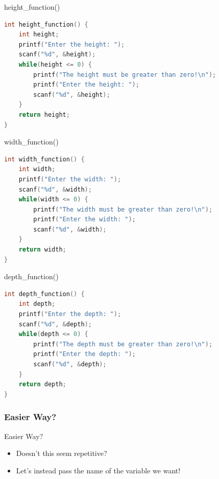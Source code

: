 \documentclass[graphics]{beamer}
\begin{document}
\begin{frame}[fragile]{height\_function()}
    \begin{lstlisting}[language=C,basicstyle=\footnotesize,keywordstyle=\color{blue},commentstyle=\color{green},showstringspaces=false,stringstyle=\color{red}]
int height_function() {
    int height;
    printf("Enter the height: ");
    scanf("%d", &height);
    while(height <= 0) {
        printf("The height must be greater than zero!\n");
        printf("Enter the height: ");
        scanf("%d", &height);
    }
    return height;
}
    \end{lstlisting}
\end{frame}

\begin{frame}[fragile]{width\_function()}
    \begin{lstlisting}[language=C,basicstyle=\footnotesize,keywordstyle=\color{blue},commentstyle=\color{green},showstringspaces=false,stringstyle=\color{red}]
int width_function() {
    int width;
    printf("Enter the width: ");
    scanf("%d", &width);
    while(width <= 0) {
        printf("The width must be greater than zero!\n");
        printf("Enter the width: ");
        scanf("%d", &width);
    }
    return width;
}
    \end{lstlisting}
\end{frame}

\begin{frame}[fragile]{depth\_function()}
    \begin{lstlisting}[language=C,basicstyle=\footnotesize,keywordstyle=\color{blue},commentstyle=\color{green},showstringspaces=false,stringstyle=\color{red}]
int depth_function() {
    int depth;
    printf("Enter the depth: ");
    scanf("%d", &depth);
    while(depth <= 0) {
        printf("The depth must be greater than zero!\n");
        printf("Enter the depth: ");
        scanf("%d", &depth);
    }
    return depth;
}
    \end{lstlisting}
\end{frame}

\subsubsection{Easier Way?}
\begin{frame}{Easier Way?}
    \begin{itemize}
        \item Doesn't this seem repetitive?
        \pause
        \item Let's instead pass the name of the variable we want!
    \end{itemize}
\end{frame}
\end{document}
